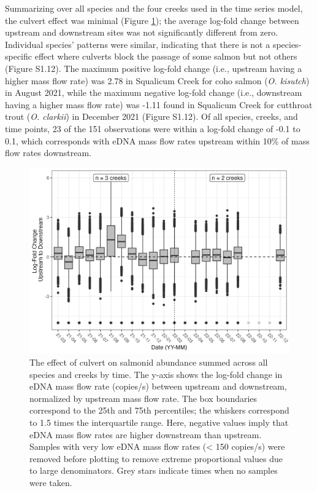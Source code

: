 \documentclass[
]{article}
\begin{document}
Summarizing over all species and the four creeks used in the time series
model, the culvert effect was minimal (Figure \ref{fig:culverts}); the
average log-fold change between upstream and downstream sites was not
significantly different from zero. Individual species' patterns were
similar, indicating that there is not a species-specific effect where
culverts block the passage of some salmon but not others (Figure S1.12).
The maximum positive log-fold change (i.e., upstream having a higher
mass flow rate) was 2.78 in Squalicum Creek for coho salmon (\emph{O.
kisutch}) in August 2021, while the maximum negative log-fold change
(i.e., downstream having a higher mass flow rate) was -1.11 found in
Squalicum Creek for cutthroat trout (\emph{O. clarkii}) in December 2021
(Figure S1.12). Of all species, creeks, and time points, 23 of the 151
observations were within a log-fold change of -0.1 to 0.1, which
corresponds with eDNA mass flow rates upstream within 10\% of mass flow
rates downstream.

\begin{figure}
\centering
\includegraphics{../Output/Figures/culvert_boxplot_passable.png}
\caption{The effect of culvert on salmonid abundance summed across all
species and creeks by time. The y-axis shows the log-fold change in eDNA
mass flow rate (copies/s) between upstream and downstream, normalized by
upstream mass flow rate. The box boundaries correspond to the 25th and
75th percentiles; the whiskers correspond to 1.5 times the interquartile
range. Here, negative values imply that eDNA mass flow rates are higher
downstream than upstream. Samples with very low eDNA mass flow rates
(\textless{} 150 copies/s) were removed before plotting to remove
extreme proportional values due to large denominators. Grey stars
indicate times when no samples were taken.\label{fig:culverts}}
\end{figure}
\end{document}
